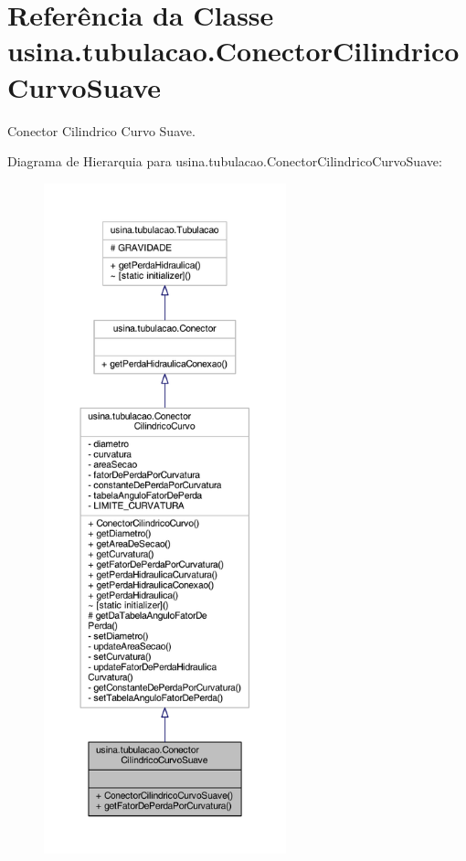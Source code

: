 \hypertarget{classusina_1_1tubulacao_1_1_conector_cilindrico_curvo_suave}{\section{Referência da Classe usina.\-tubulacao.\-Conector\-Cilindrico\-Curvo\-Suave}
\label{classusina_1_1tubulacao_1_1_conector_cilindrico_curvo_suave}
}


Conector Cilindrico Curvo Suave.  




Diagrama de Hierarquia para usina.\-tubulacao.\-Conector\-Cilindrico\-Curvo\-Suave\-:
\nopagebreak
\begin{figure}[H]
\begin{center}
\leavevmode
\includegraphics[height=550pt]{classusina_1_1tubulacao_1_1_conector_cilindrico_curvo_suave__inherit__graph}
\end{center}
\end{figure}


